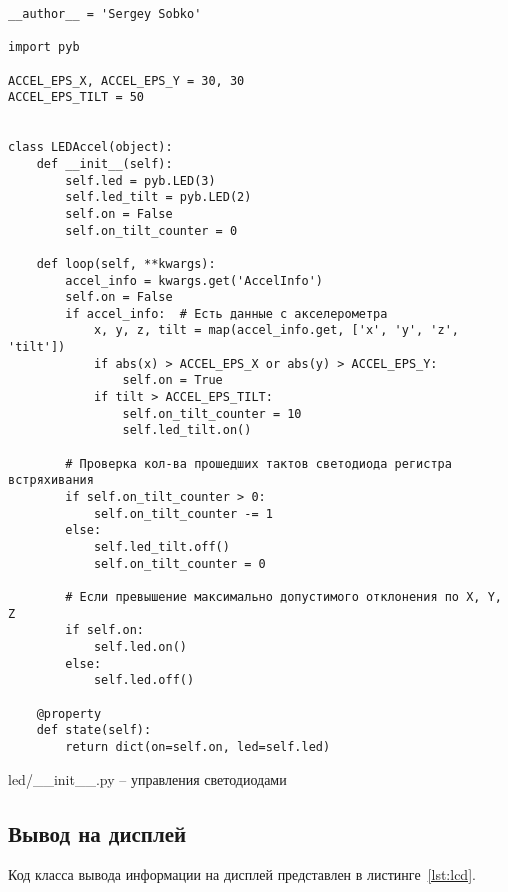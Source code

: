 \documentclass[document.tex]{subfiles}
\begin{document}
\begin{listing}[ht]
\begin{verbatim}
__author__ = 'Sergey Sobko'

import pyb

ACCEL_EPS_X, ACCEL_EPS_Y = 30, 30
ACCEL_EPS_TILT = 50


class LEDAccel(object):
    def __init__(self):
        self.led = pyb.LED(3)
        self.led_tilt = pyb.LED(2)
        self.on = False
        self.on_tilt_counter = 0

    def loop(self, **kwargs):
        accel_info = kwargs.get('AccelInfo')
        self.on = False
        if accel_info:  # Есть данные с акселерометра
            x, y, z, tilt = map(accel_info.get, ['x', 'y', 'z', 'tilt'])
            if abs(x) > ACCEL_EPS_X or abs(y) > ACCEL_EPS_Y:
                self.on = True
            if tilt > ACCEL_EPS_TILT:
                self.on_tilt_counter = 10
                self.led_tilt.on()

        # Проверка кол-ва прошедших тактов светодиода регистра встряхивания
        if self.on_tilt_counter > 0:
            self.on_tilt_counter -= 1
        else:
            self.led_tilt.off()
            self.on_tilt_counter = 0

        # Если превышение максимально допустимого отклонения по X, Y, Z
        if self.on:
            self.led.on()
        else:
            self.led.off()

    @property
    def state(self):
        return dict(on=self.on, led=self.led)
\end{verbatim}
\caption{led/\_\_init\_\_.py -- управления светодиодами}
\label{lst:led}
\end{listing}


\clearpage
\subsection{Вывод на дисплей}
Код класса вывода информации на дисплей представлен в листинге~\ref{lst:lcd}.
\end{document}

